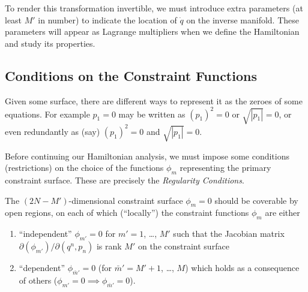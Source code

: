 
To render this transformation invertible, we must introduce extra
parameters (at least $M'$ in number) to indicate the location of
$\dot{q}$ on the inverse manifold. These parameters will appear as
Lagrange multipliers when we define the Hamiltonian and study its
properties.

\subsection{Conditions on the Constraint Functions}

\label{n:regularity-conditions:motivating-example}
Given some surface, there are different ways to represent it as the
zeroes of some equations. For example $p_{1}=0$ may be written as
$(p_{1})^{2}=0$ or $\sqrt{|p_{1}|}=0$, or even redundantly as (say)
$(p_{1})^{2}=0$ and $\sqrt{|p_{1}|}=0$.

Before continuing our Hamiltonian analysis, we must impose some
conditions (restrictions) on the choice of the functions $\phi_{m}$
representing the primary constraint surface. These are precisely the
\emph{Regularity Conditions}.

\label{n:constrained-hamiltonian:regularity-cond}
The $(2N-M')$-dimensional constraint surface $\phi_{m}=0$ should be
coverable by open regions, on each of which (``locally'') the
constraint functions $\phi_{m}$ are either
\begin{enumerate}
  \item ``independent'' $\phi_{m'}=0$ for $m'=1$, \dots, $M'$ such that
    the Jacobian matrix $\partial(\phi_{m'})/\partial(q^{n},p_{n})$ is
    rank $M'$ on the constraint surface
  \item ``dependent'' $\phi_{\bar{m}'}=0$ (for $\bar{m}'=M'+1$, \dots,
    $M$) which holds as a consequence of others ($\phi_{m'}=0\implies\phi_{\bar{m}'}=0$).
\end{enumerate}

